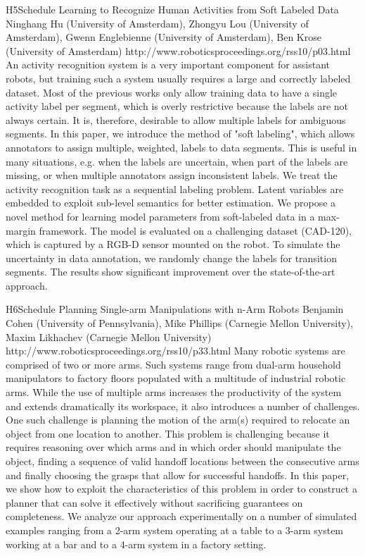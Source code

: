 \begin{spacing}{1.0}
\descriptionPaper
{H5}{Schedule}
{	
Learning to Recognize Human Activities from Soft Labeled Data
}
{
Ninghang Hu (University of Amsterdam), Zhongyu Lou (University of Amsterdam), Gwenn Englebienne (University of Amsterdam), Ben Krose (University of Amsterdam)
}
{
http://www.roboticsproceedings.org/rss10/p03.html
}
{
An activity recognition system is a very important component for assistant robots, but training such a system usually requires a large and correctly labeled dataset. Most of the previous works only allow training data to have a single activity label per segment, which is overly restrictive because the labels are not always certain. It is, therefore, desirable to allow multiple labels for ambiguous segments. In this paper, we introduce the method of "soft labeling", which allows annotators to assign multiple, weighted, labels to data segments. This is useful in many situations, e.g. when the labels are uncertain, when part of the labels are missing, or when multiple annotators assign inconsistent labels. We treat the activity recognition task as a sequential labeling problem. Latent variables are embedded to exploit sub-level semantics for better estimation. We propose a novel method for learning model parameters from soft-labeled data in a max-margin framework. The model is evaluated on a challenging dataset (CAD-120), which is captured by a RGB-D sensor mounted on the robot. To simulate the uncertainty in data annotation, we randomly change the labels for transition segments. The results show significant improvement over the state-of-the-art approach.
}




\descriptionPaper
{H6}{Schedule}
{	
Planning Single-arm Manipulations with n-Arm Robots
}
{
Benjamin Cohen (University of Pennsylvania), Mike Phillips (Carnegie Mellon University), Maxim Likhachev (Carnegie Mellon University)
}
{
http://www.roboticsproceedings.org/rss10/p33.html
}
{
Many robotic systems are comprised of two or more arms. Such systems range from dual-arm household manipulators to factory floors populated with a multitude of industrial robotic arms. While the use of multiple arms increases the productivity of the system and extends dramatically its workspace, it also introduces a number of challenges. One such challenge is planning the motion of the arm(s) required to relocate an object from one location to another. This problem is challenging because it requires reasoning over which arms and in which order should manipulate the object, finding a sequence of valid handoff locations between the consecutive arms and finally choosing the grasps that allow for successful handoffs. In this paper, we show how to exploit the characteristics of this problem in order to construct a planner that can solve it effectively without sacrificing guarantees on completeness. We analyze our approach experimentally on a number of simulated examples ranging from a 2-arm system operating at a table to a 3-arm system working at a bar and to a 4-arm system in a factory setting.
}




\end{spacing}
